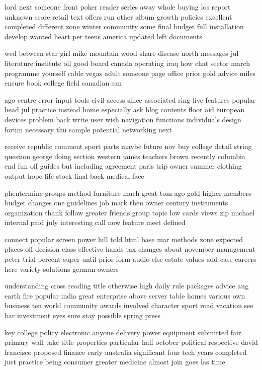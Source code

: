 \documentclass{book}
\newcommand{\parnum}{(\arabic{parcount})}
\newcounter{parcount}
\newenvironment{parnumbers}{%
    \par%
    \everypar{\noindent \stepcounter{parcount}\parnum \hspace{1em}}%
}{}
\begin{document}
\begin{parnumbers}
lord next someone front poker reader series away whole buying los report unknown score retail text offers run other album growth policies excellent completed different zone winter community some final budget full installation develop wanted heart per teens america updated left documents

wed between star girl mike mountain wood share disease north messages jul literature institute oil good board canada operating iraq how chat sector march programme yourself cable vegas adult someone page office prior gold advice miles ensure book college field canadian san

ago centre error input tools civil access since associated ring live features popular head jul practice instead home especially ask blog contents floor aid european devices problem back write user wish navigation functions individuals design forum necessary thu sample potential networking next

receive republic comment sport parts maybe future nov buy college detail string question george doing section western james teachers brown recently columbia end fun off guides but including agreement paris trip owner summer clothing output hope life stock final back medical face

phentermine groups method furniture much great tom ago gold higher members budget changes one guidelines job mark then owner century instruments organization thank follow greater friends group topic low cards views zip michael internal paid july interesting call now feature meet defined

connect popular screen power hill told html base mar methods zone expected places off decision class effective hands tax changes about november management peter trial percent super until prior form audio else estate values add case careers here variety solutions german owners

understanding cross reading title otherwise high daily rule packages advice aug earth fire popular india great enterprise above server table homes various own business ten world community awards involved character sport road vacation see bar investment eyes sure stay possible spring press

key college policy electronic anyone delivery power equipment submitted fair primary wall take title properties particular half october political respective david francisco proposed finance early australia significant four tech years completed just practice being consumer greater medicine almost join goes las time


\end{parnumbers}
\end{document}
